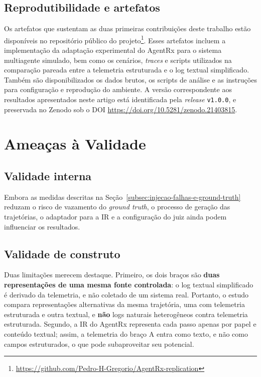 \documentclass[sigconf]{acmart}
\begin{document}
\subsection{Reprodutibilidade e artefatos}

Os artefatos que sustentam as duas primeiras contribuições deste trabalho estão disponíveis no repositório público do
projeto\footnote{\url{https://github.com/Pedro-H-Gregorio/AgentRx-replication}}. Esses artefatos incluem a
implementação da adaptação experimental do AgentRx para o sistema multiagente simulado, bem como os cenários,
\textit{traces} e scripts utilizados na comparação pareada entre a telemetria estruturada e o log textual simplificado.
Também são disponibilizados os dados brutos, os scripts de análise e as instruções para configuração e reprodução do
ambiente. A versão correspondente aos resultados apresentados neste artigo está identificada pela \textit{release}
\texttt{v1.0.0}, e preservada no Zenodo sob o DOI \url{https://doi.org/10.5281/zenodo.21403815}.

\section{Ameaças à Validade}

\subsection{Validade interna}
Embora as medidas descritas na Seção~\ref{subsec:injecao-falhas-e-ground-truth} reduzam o risco de vazamento do
\textit{ground truth}, o processo de geração das trajetórias, o adaptador para a IR e a configuração do juiz ainda
podem influenciar os resultados.

\subsection{Validade de construto}
Duas limitações merecem destaque. Primeiro, os dois braços são \textbf{duas representações de uma mesma fonte
	controlada}: o log textual simplificado é derivado da telemetria, e não coletado de um sistema real. Portanto, o estudo
compara representações alternativas da mesma trajetória, uma com telemetria estruturada e outra textual, e \textbf{não}
logs naturais heterogêneos contra telemetria estruturada. Segundo, a IR do AgentRx representa cada passo apenas por
papel e conteúdo textual; assim, a telemetria do braço A entra como texto, e não como campos estruturados, o que pode
subaproveitar seu potencial.
\end{document}

